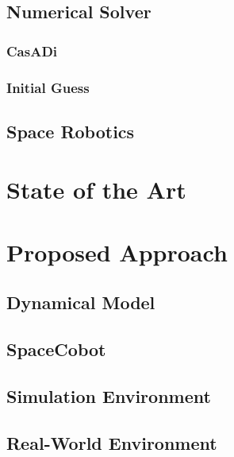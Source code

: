 \documentclass[a4paper, oneside]{article}
\begin{document}
    \subsection{Numerical Solver}
    \subsubsection{CasADi}
    

    \subsubsection{Initial Guess}
    

    \subsection{Space Robotics}
    


\clearpage
\section{State of the Art}
    

\clearpage
\section{Proposed Approach}

    \subsection{Dynamical Model}
    

    \subsection{SpaceCobot}\label{sec:Proposed Approach: Space Cobot}
    


    \subsection{Simulation Environment}
    

    \subsection{Real-World Environment}
    
\end{document}

